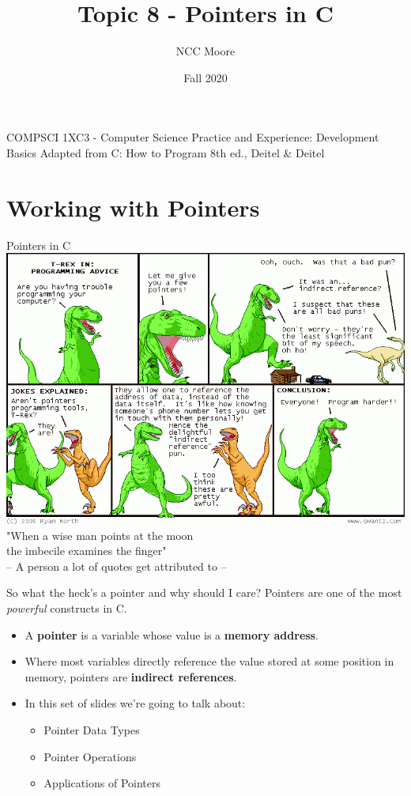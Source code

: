 \documentclass[11pt]{beamer}
\author{NCC Moore}
\title{Topic 8 - Pointers in C}
\institute{McMaster University}
\date{Fall 2020}
\begin{document}
\begin{frame}
\center
COMPSCI 1XC3 - Computer Science Practice and Experience:
Development Basics
\titlepage
Adapted from C: How to Program 8th ed., Deitel \& Deitel
\end{frame}

\begin{frame}
\tableofcontents
\end{frame}

\section[Syntax]{Working with Pointers} %
\begin{frame}{Pointers in C}
\center
\includegraphics[scale=0.28]{DCPointers.png} \\
"When a wise man points at the moon \\the imbecile examines the finger" \\
-- A person a lot of quotes get attributed to -- 
\end{frame}

\begin{frame}{So what the heck's a pointer and why should I care?}
Pointers are one of the most \textit{powerful} constructs in C.
\begin{itemize}
\item A \textbf{pointer} is a variable whose value is a \textbf{memory address}.
\item Where most variables directly reference the value stored at some position in memory, pointers are \textbf{indirect references}.  
\item In this set of slides we're going to talk about:
\begin{itemize}
\item Pointer Data Types
\item Pointer Operations
\item Applications of Pointers
\end{itemize}
\end{itemize}
\end{frame}
\end{document}
